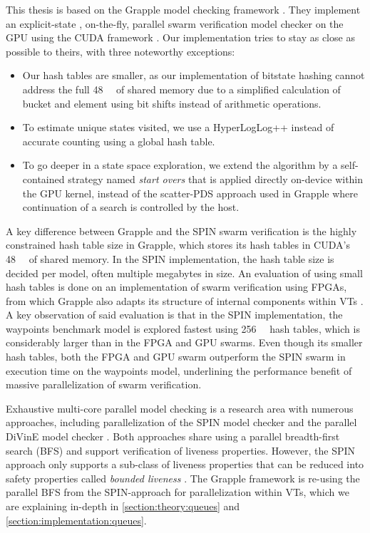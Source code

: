\documentclass[
fancyheadings, %
%
%
]{stsreprt}
\begin{document}
This thesis is based on the Grapple model checking framework \cite{DeFrancisco2020.Grapple}.
They implement an explicit-state \cite{Holzmann2018.Explicit-State-Model-Checking}, on-the-fly, parallel swarm verification model checker on the GPU using the CUDA framework \cite{CUDA-Programming-Guide}.
Our implementation tries to stay as close as possible to theirs, with three noteworthy exceptions:

\begin{itemize}
    \item Our hash tables are smaller, as our implementation of bitstate hashing cannot address the full \SI{48}{\kibi\byte} of shared memory due to a simplified calculation of bucket and element using bit shifts instead of arithmetic operations.
    \item To estimate unique states visited, we use a HyperLogLog++ instead of accurate counting using a global hash table.
    \item To go deeper in a state space exploration, we extend the algorithm by a self-contained strategy named \emph{start overs} that is applied directly on-device within the GPU kernel, instead of the scatter-PDS approach used in Grapple where continuation of a search is controlled by the host.
\end{itemize}

A key difference between Grapple and the SPIN swarm verification is the highly constrained hash table size in Grapple, which stores its hash tables in CUDA's \SI{48}{\kibi\byte} of shared memory.
In the SPIN implementation, the hash table size is decided per model, often multiple megabytes in size.
An evaluation of using small hash tables is done on an implementation of swarm verification using FPGAs, from which Grapple also adapts its structure of internal components within VTs \cite{Cho2018}.
A key observation of said evaluation is that in the SPIN implementation, the waypoints benchmark model is explored fastest using \SI{256}{\mega\byte} hash tables, which is considerably larger than in the FPGA and GPU swarms.
Even though its smaller hash tables, both the FPGA and GPU swarm outperform the SPIN swarm in execution time on the waypoints model, underlining the performance benefit of massive parallelization of swarm verification.

Exhaustive multi-core parallel model checking is a research area with numerous approaches, including parallelization of the SPIN model checker \cite{Holzmann2004} and the parallel DiVinE model checker \cite{Barnat2008, Barnat2007}.
Both approaches share using a parallel breadth-first search (BFS) and support verification of liveness properties.
However, the SPIN approach only supports a sub-class of liveness properties that can be reduced into safety properties called \emph{bounded liveness} \cite{Holzmann2012.Paralellizing-SPIN}.
The Grapple framework is re-using the parallel BFS from the SPIN-approach for parallelization within VTs, which we are explaining in-depth in \cref{section:theory:queues} and \cref{section:implementation:queues}.
\end{document}
